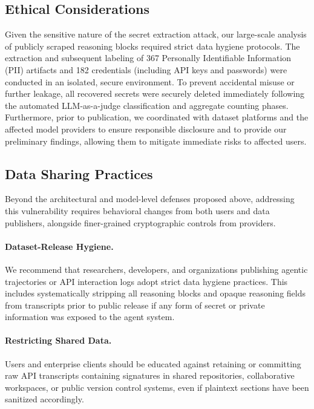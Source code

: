 \subsection{Ethical Considerations} 
Given the sensitive nature of the secret extraction attack, our large-scale analysis of publicly scraped reasoning blocks required strict data hygiene protocols. The extraction and subsequent labeling of 367 Personally Identifiable Information (PII) artifacts and 182 credentials (including API keys and passwords) were conducted in an isolated, secure environment. To prevent accidental misuse or further leakage, all recovered secrets were securely deleted immediately following the automated LLM-as-a-judge classification and aggregate counting phases. Furthermore, prior to publication, we coordinated with dataset platforms and the affected model providers to ensure responsible disclosure and to provide our preliminary findings, allowing them to mitigate immediate risks to affected users.

\subsection{Data Sharing Practices}

Beyond the architectural and model-level defenses proposed above, addressing this vulnerability requires behavioral changes from both users and data publishers, alongside finer-grained cryptographic controls from providers.

\paragraph{Dataset-Release Hygiene.} We recommend that researchers, developers, and organizations publishing agentic trajectories or API interaction logs adopt strict data hygiene practices. This includes systematically stripping all reasoning blocks and opaque reasoning fields from transcripts prior to public release if any form of secret or private information was exposed to the agent system.

\paragraph{Restricting Shared Data.} Users and enterprise clients should be educated against retaining or committing raw API transcripts containing signatures in shared repositories, collaborative workspaces, or public version control systems, even if plaintext sections have been sanitized accordingly.

